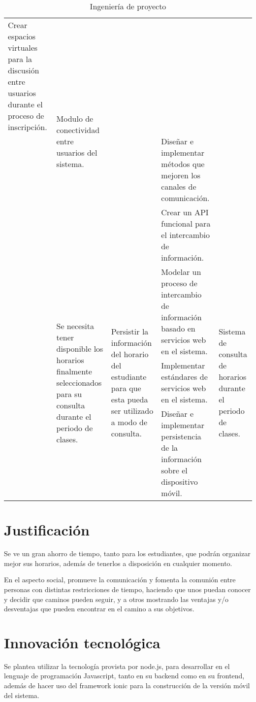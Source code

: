 \documentclass[letterpaper,11pt]{article}
\begin{document}
\begin{sidewaystable}
\begin{tabular}{|l|l|l|p{6.5cm}|l|}
Crear espacios virtuales para la discusión entre usuarios durante el proceso de
inscripción. &
\multirow{3}{2.5cm}{Modulo de conectividad entre usuarios del sistema.} \\
\cline{4-4}
& & & Diseñar e implementar métodos que mejoren los canales de comunicación. & \\
\cline{4-4}
& & & Crear un API funcional para el intercambio de información. & \\
\cline{2-5}
& \multirow{3}{3cm}{Se necesita tener disponible los horarios finalmente
seleccionados para su consulta durante el periodo de clases.} &
\multirow{3}{3.5cm}{Persistir la información del horario del estudiante para que
esta pueda ser utilizado a modo de consulta.} &
Modelar un proceso de intercambio de información basado en servicios web en el
sistema. &
\multirow{3}{2.5cm}{Sistema de consulta de horarios durante el periodo de
clases.} \\
\cline{4-4}
& & & Implementar estándares de servicios web en el sistema. & \\
\cline{4-4}
& & & Diseñar e implementar persistencia de la información sobre el dispositivo
móvil. & \\
\hline
\end{tabular}
\caption{Ingeniería de proyecto}
\label{ingenieriadeproyecto}
\end{sidewaystable}

\section{Justificación}
Se ve un gran ahorro de tiempo, tanto para los estudiantes, que podrán
organizar mejor sus horarios, además de tenerlos a disposición en cualquier
momento.

En el aspecto social, promueve la comunicación y fomenta la comunión entre
personas con distintas restricciones de tiempo, haciendo que unos puedan conocer
y decidir que caminos pueden seguir, y a otros mostrando las ventajas y/o
desventajas que pueden encontrar en el camino a sus objetivos.

\section{Innovación tecnológica}
Se plantea utilizar la tecnología provista por node.js, para desarrollar en el
lenguaje de programación Javascript, tanto en su backend como en su frontend,
además de hacer uso del framework ionic para la construcción de la versión móvil
del sistema.
\end{document}
